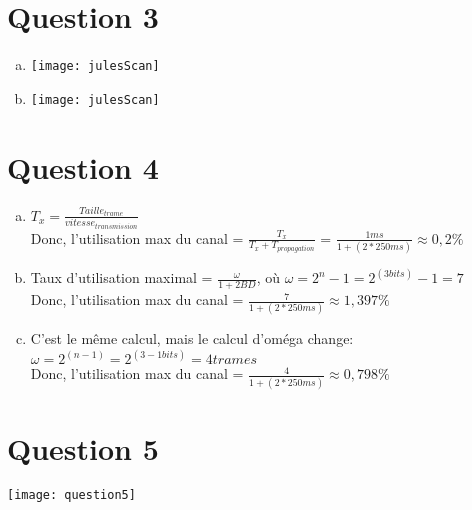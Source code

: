 \section{Question 3}

\begin{enumerate}[(a)]
	\item
		\parbox{\linewidth}{\centering
		\texttt{[image: julesScan]}
		}
	\item
		\parbox{\linewidth}{\centering
		\texttt{[image: julesScan]}
		}
\end{enumerate}


\section{Question 4}
\begin{enumerate}[(a)]
	\item  $T_{x} = \frac{Taille_{trame}}{vitesse_{transmission}}$ \\
Donc, l'utilisation max du canal = $\frac{T_{x}}{T_{x}+T_{propagation}}$ 
		=  $\frac{1 ms}{1+(2 * 250ms)} \approx 0,2\%$
	\item Taux d'utilisation maximal = $\frac{\omega}{1+2BD}$, où 
		$\omega = 2^n-1 = 2^(3bits)-1 = 7$\\
		Donc, l'utilisation max du canal = $\frac{7}{1+(2 * 250ms)} \approx 1,397\%$
	\item C'est le même calcul, mais le calcul d'oméga change:
		$\omega = 2^{(n-1)} = 2^{(3-1bits)} = 4  trames$\\
		Donc, l'utilisation max du canal = $\frac{4}{1+(2 * 250ms)} \approx 0,798\%$
\end{enumerate}

\section{Question 5}
\parbox{\linewidth}{\centering
\texttt{[image: question5]}
}

